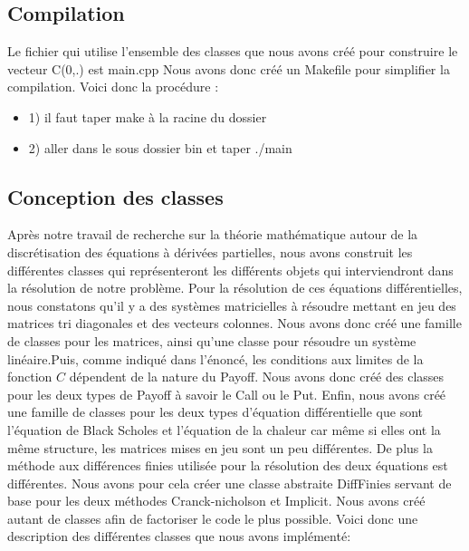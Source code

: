 \documentclass[11pt,a4paper]{article}
\begin{document}
\subsection{Compilation}
Le fichier qui utilise l'ensemble des classes que nous avons créé pour construire le vecteur C(0,.) est main.cpp
Nous avons donc créé un Makefile pour simplifier la compilation.
Voici donc la procédure :
\begin{itemize}
\item 1) il faut taper make à la racine du dossier
\item 2) aller dans le sous dossier bin et taper ./main
\end{itemize}
\subsection{Conception des classes}
Après notre travail de recherche sur la théorie mathématique autour de la discrétisation des équations à dérivées partielles, nous avons construit les différentes classes qui représenteront les différents objets qui interviendront dans la résolution de notre problème. 
Pour la résolution de ces équations différentielles, nous constatons qu'il y a des systèmes matricielles à résoudre mettant en jeu des matrices tri diagonales et des vecteurs colonnes. Nous avons donc créé une famille de classes pour les matrices, ainsi qu'une classe pour résoudre un système linéaire.Puis, comme indiqué dans l'énoncé, les conditions aux limites de la fonction $C$ dépendent de la nature du Payoff. Nous avons donc créé des classes pour les deux types de Payoff à savoir le Call ou le Put. Enfin, nous avons créé une famille de classes pour les deux types d'équation différentielle que sont l'équation de Black Scholes et l'équation de la chaleur car même si elles ont la même structure, les matrices mises en jeu sont un peu différentes. De plus la méthode aux différences finies utilisée pour la résolution des deux équations est différentes. Nous avons pour cela créer une classe abstraite DiffFinies servant de base pour les deux méthodes Cranck-nicholson et Implicit.
Nous avons créé autant de classes afin de factoriser le code le plus possible.
\newpage
Voici donc une description des différentes classes que nous avons implémenté:
\end{document}

